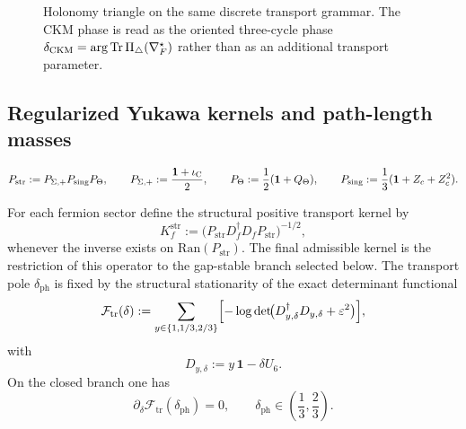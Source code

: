 \begin{figure}[t]
\centering
\scriptsize
{}
\caption{Holonomy triangle on the same discrete transport grammar. The CKM phase is read as the
oriented three-cycle phase $\delta_{\mathrm{CKM}}=\arg\operatorname{Tr}\Pi_\triangle(\nabla_F^\star)$ rather
than as an additional transport parameter.}
\label{fig:holonomy-triangle}
\end{figure}

\subsection{Regularized Yukawa kernels and path-length masses}

\[
P_{\mathrm{str}}:=P_{\Sigma,+}P_{\mathrm{sing}}P_\Theta,
\qquad
P_{\Sigma,+}:=\frac{\mathbf 1+\iota_{\mathrm C}}{2},
\qquad
P_\Theta:=\frac12(\mathbf 1+Q_\Theta),
\qquad
P_{\mathrm{sing}}:=\frac13(\mathbf 1+Z_c+Z_c^2).
\]

\begin{definition}
\label{def:structural-transport-kernel}
For each fermion sector define the structural positive transport kernel by
\[
K_f^{\mathrm{str}}:=\bigl(P_{\mathrm{str}} D_f^\dagger D_f P_{\mathrm{str}}\bigr)^{-1/2},
\]
whenever the inverse exists on $\mathrm{Ran}(P_{\mathrm{str}})$. The final admissible kernel is
the restriction of this operator to the gap-stable branch selected below. The transport pole
$\delta_{\mathrm{ph}}$ is fixed by the structural stationarity of the exact determinant functional
\[
\mathcal F_{\mathrm{tr}}(\delta)
:=
\sum_{y\in\{1,1/3,2/3\}}
\Bigl[-\log\det\!\bigl(D_{y,\delta}^\dagger D_{y,\delta}+\varepsilon^2\bigr)\Bigr],
\]
with
\[
D_{y,\delta}:=y\,\mathbf 1-\delta U_6.
\]
On the closed branch one has
\begin{equation}
\label{eq:transport-bridge-offset}
\partial_\delta \mathcal F_{\mathrm{tr}}(\delta_{\mathrm{ph}})=0,
\qquad
\delta_{\mathrm{ph}}\in\left(\frac13,\frac23\right).
\end{equation}
\end{definition}

